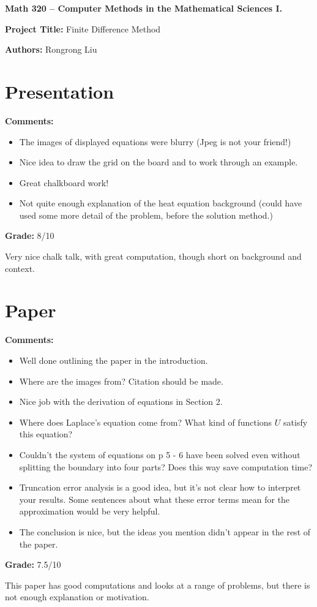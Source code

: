 \documentclass[12pt]{article}
\begin{document}
{\bf \large Math 320 -- Computer Methods in the Mathematical Sciences I.}\\

\vspace{3mm}

{\bf \large Project Title:} Finite Difference Method\\
\vspace{2mm}

{\bf \large Authors:} Rongrong Liu\\

\vspace{3mm}

\section{Presentation}
{\bf \large Comments:}
\begin{itemize}
\item The images of displayed equations were blurry (Jpeg is not your friend!)
\item Nice idea to draw the grid on the board and to work through an example.
\item Great chalkboard work!
\item Not quite enough explanation of the heat equation background (could
have used some more detail of the problem, before the solution method.)
\end{itemize}

{\bf \large Grade:} 8/10

Very nice chalk talk, with great computation, though short on background
and context.


\section{Paper}

{\bf \large Comments:}
\begin{itemize}
\item Well done outlining the paper in the introduction.
\item Where are the images from? Citation should be made.
\item Nice job with the derivation of equations in Section 2.
\item Where does Laplace's equation come from? What kind of functions
$U$ satisfy this equation?
\item Couldn't the system of equations on p 5 - 6 have been solved
even without splitting the boundary into four parts? Does this way save
computation time?
\item Truncation error analysis is a good idea, but it's not clear
how to interpret your results. Some sentences about what these error
terms mean for the approximation would be very helpful.
\item The conclusion is nice, but the ideas you mention didn't appear in the
rest of the paper.
\end{itemize}

{\bf \large Grade:} 7.5/10

This paper has good computations and looks at a range of problems,
but there is not enough explanation or motivation.
\end{document}
